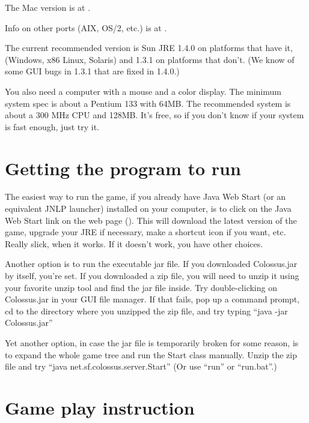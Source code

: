 \documentclass{article}
\begin{document}
The Mac version is at
.

Info on other ports (AIX, OS/2, etc.) is at 
.

The current recommended version is Sun JRE 1.4.0 on platforms that have it,
(Windows, x86 Linux, Solaris) and 1.3.1 on platforms that don't.  (We know of 
some GUI bugs in 1.3.1 that are fixed in 1.4.0.)

You also need a computer with a mouse and a color display.  The minimum system
spec is about a Pentium 133 with 64MB.  The recommended system is about a 300 
MHz CPU and 128MB.  It's free, so if you don't know if your system is fast 
enough, just try it.

\section{Getting the program to run}

The easiest way to run the game, if you already have Java Web Start (or an 
equivalent JNLP launcher) installed on your computer, is to click on the Java 
Web Start link on the web page 
().  
This will download the latest version of the game, upgrade your JRE if 
necessary, make a shortcut icon if you want, etc.  Really slick, when it works.
If it doesn't work, you have other choices.

Another option is to run the executable jar file. If you downloaded 
Colossus.jar by itself, you're set. If you downloaded a zip file, you will need
to unzip it using your favorite unzip tool and find the jar file inside. Try 
double-clicking on Colossus.jar in your GUI file manager.  If that fails,
pop up a command prompt, cd to the directory where you unzipped the zip file, 
and try typing ``java -jar Colossus.jar''

Yet another option, in case the jar file is temporarily broken for some reason, 
is to expand the whole game tree and run the Start class manually.  Unzip the 
zip file and try ``java net.sf.colossus.server.Start''  (Or use ``run'' or
``run.bat''.)

\section{Game play instruction}
\end{document}
